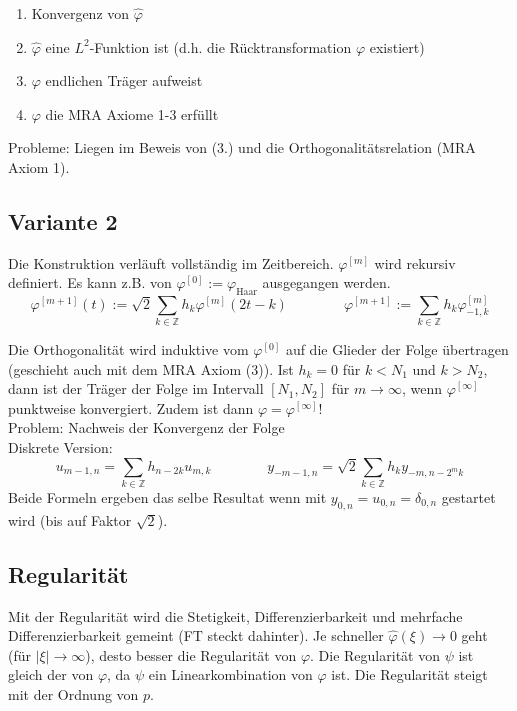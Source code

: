 \vspace{-0.4cm}

\begin{enumerate}
	\itemsep-0.2cm
	\item Konvergenz von $\hat{\varphi}$
	\item $\hat{\varphi}$ eine $L^2$-Funktion ist (d.h. die Rücktransformation $\varphi$ existiert)
	\item $\varphi$ endlichen Träger aufweist
	\item $\varphi$ die MRA Axiome 1-3 erfüllt
\end{enumerate}
Probleme: Liegen im Beweis von (3.) und die Orthogonalitätsrelation (MRA Axiom 1).


\subsection{Variante 2}
Die Konstruktion verläuft vollständig im Zeitbereich. $\varphi^{[m]}$ wird rekursiv definiert. Es kann z.B. von $\varphi^{[0]}:=\varphi_{\text{Haar}}$ ausgegangen werden.
\[ 
	\varphi^{[m+1]}(t) := \sqrt{2} \sum_{k \in \mathbb{Z}} h_k \varphi^{[m]}(2t-k) 
	\qquad \qquad
	\varphi^{[m+1]} := \sum_{k \in \mathbb{Z}} h_k \varphi^{[m]}_{-1,k} 
\]

Die Orthogonalität wird induktive vom $\varphi^{[0]}$ auf die Glieder der Folge übertragen (geschieht auch mit dem MRA Axiom (3)).
Ist $h_k=0$ für $k<N_1$ und $k>N_2$, dann ist der Träger der Folge im Intervall $[N_1,N_2]$ für $m\rightarrow\infty$, wenn $\varphi^{[\infty]}$ punktweise konvergiert. Zudem ist dann $\varphi = \varphi^{[\infty]}$!\\

Problem: Nachweis der Konvergenz der Folge\\

Diskrete Version:
\[ 
	u_{m-1,n} = \sum_{k \in \mathbb{Z}} h_{n-2k}u_{m,k}
	\qquad \qquad
	y_{-m-1,n}=\sqrt{2} \sum_{k \in \mathbb{Z}} h_k y_{-m,n-2^mk}
\]
Beide Formeln ergeben das selbe Resultat wenn mit $y_{0,n}=u_{0,n}=\delta_{0,n}$ gestartet wird (bis auf Faktor $\sqrt{2}$).


\subsection{Regularität}
Mit der Regularität wird  die Stetigkeit, Differenzierbarkeit und mehrfache Differenzierbarkeit gemeint (FT steckt dahinter).
Je schneller $\hat{\varphi}(\xi) \rightarrow 0$ geht (für $|\xi| \rightarrow \infty$), desto besser die Regularität von $\varphi$. Die Regularität von $\psi$ ist gleich der von $\varphi$, da $\psi$ ein Linearkombination von $\varphi$ ist. Die Regularität steigt mit der Ordnung von $p$.\\

